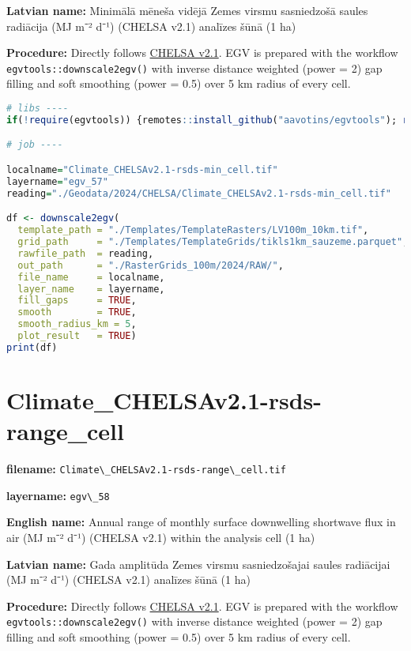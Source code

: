 \documentclass[
]{book}
\newcommand{\passthrough}[1]{#1}
\begin{document}
\textbf{Latvian name:} Minimālā mēneša vidējā Zemes virsmu sasniedzošā saules radiācija (MJ m⁻² d⁻¹) (CHELSA v2.1) analīzes šūnā (1 ha)

\textbf{Procedure:} Directly follows \hyperref[Ch04.11]{CHELSA v2.1}. EGV is prepared with the
workflow \passthrough{\lstinline!egvtools::downscale2egv()!} with inverse distance weighted (power = 2)
gap filling and soft smoothing (power = 0.5) over 5 km radius of every cell.

\begin{lstlisting}[language=R]
# libs ----
if(!require(egvtools)) {remotes::install_github("aavotins/egvtools"); require(egvtools)}

# job ----

localname="Climate_CHELSAv2.1-rsds-min_cell.tif"
layername="egv_57"
reading="./Geodata/2024/CHELSA/Climate_CHELSAv2.1-rsds-min_cell.tif"

df <- downscale2egv(
  template_path = "./Templates/TemplateRasters/LV100m_10km.tif",
  grid_path     = "./Templates/TemplateGrids/tikls1km_sauzeme.parquet",
  rawfile_path  = reading,
  out_path      = "./RasterGrids_100m/2024/RAW/",
  file_name     = localname,
  layer_name    = layername,
  fill_gaps     = TRUE,
  smooth        = TRUE,
  smooth_radius_km = 5,
  plot_result   = TRUE)
print(df)
\end{lstlisting}

\section{Climate\_CHELSAv2.1-rsds-range\_cell}\label{ch06.058}

\textbf{filename:} \passthrough{\lstinline!Climate\_CHELSAv2.1-rsds-range\_cell.tif!}

\textbf{layername:} \passthrough{\lstinline!egv\_58!}

\textbf{English name:} Annual range of monthly surface downwelling shortwave flux in air (MJ m⁻² d⁻¹) (CHELSA v2.1) within the analysis cell (1 ha)

\textbf{Latvian name:} Gada amplitūda Zemes virsmu sasniedzošajai saules radiācijai (MJ m⁻² d⁻¹) (CHELSA v2.1) analīzes šūnā (1 ha)

\textbf{Procedure:} Directly follows \hyperref[Ch04.11]{CHELSA v2.1}. EGV is prepared with the
workflow \passthrough{\lstinline!egvtools::downscale2egv()!} with inverse distance weighted (power = 2)
gap filling and soft smoothing (power = 0.5) over 5 km radius of every cell.
\end{document}
